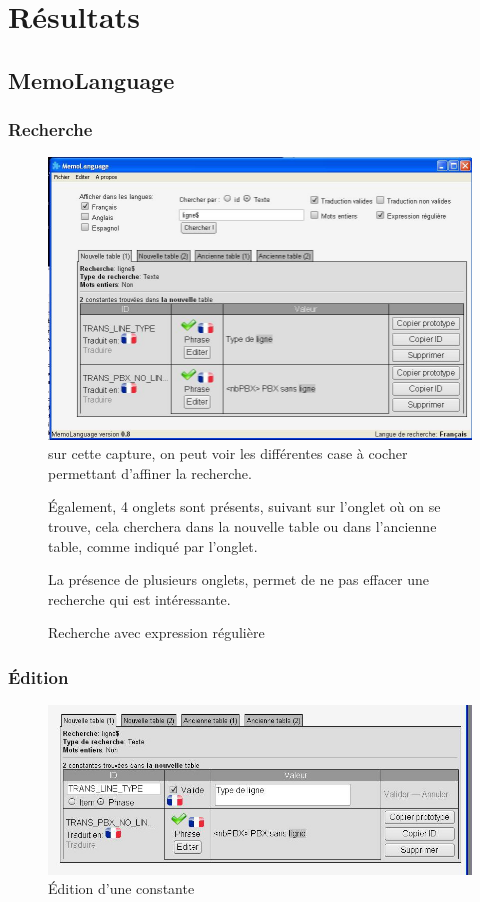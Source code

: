 \chapter{Résultats}
    \section{MemoLanguage}
    \subsection{Recherche}
    \begin{figure}[H]
        \centering
        \includegraphics[width=16cm]{images/2-activite/searchRegex.jpg}\label{searchRegex}
        sur cette capture, on peut voir les différentes case à cocher permettant d'affiner la recherche.

            \'Egalement, 4 onglets sont présents, suivant sur l'onglet où on se trouve, cela cherchera dans la nouvelle table ou dans l'ancienne table, comme indiqué par l'onglet.

            La présence de plusieurs onglets, permet de ne pas effacer une recherche qui est intéressante.

        \caption{Recherche avec expression régulière}
    \end{figure}

    \subsection{\'Edition}
        \begin{figure}[H]
            \centering
            \includegraphics[width=16cm]{images/2-activite/edition.jpg}
            \caption{\'Edition d'une constante}
            \label{edition}
        \end{figure}
